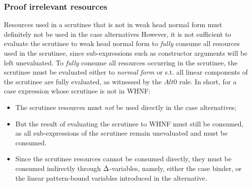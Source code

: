 \documentclass[acmsmall, screen, review]{acmart}
\begin{document}


\subsubsection{Proof irrelevant resources}


Resources used in a scrutinee that is not in weak head normal form must
definitely not be used in the case alternatives
%
However, it is not sufficient to evaluate the scrutinee to weak head normal
form to \emph{fully} consume all resources used in the scrutinee, since
sub-expressions such as constructor arguments will be left unevaluated. To
\emph{fully} consume all resources occurring in the scrutinee, the scrutinee
must be evaluated either to \emph{normal form} or s.t. all linear components of
the scrutinee are fully evaluated, as witnessed by the $Alt0$ rule. In short,
for a case expression whose scrutinee is not in WHNF:
\begin{itemize}

\item The scrutinee resources must \emph{not} be used directly in the case alternatives;
\item But the result of evaluating the scrutinee to WHNF must still be
consumed, as all sub-expressions of the scrutinee remain unevaluated and must
be consumed.
\item Since the scrutinee resources cannot be consumed directly, they must be
consumed indirectly through $\Delta$-variables, namely, either the case binder, or
the linear pattern-bound variables introduced in the alternative.

\end{itemize}
\end{document}
